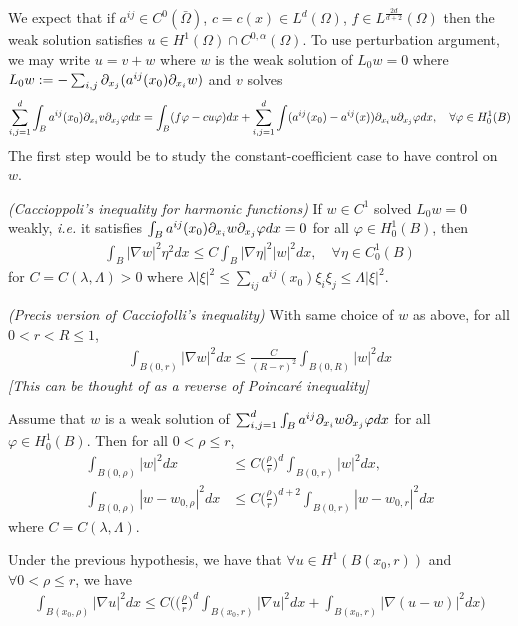 \documentclass[10pt,a4paper]{article}
\begin{document}
We expect that if $a^{ij} \in C^0(\bar{\Omega})$, $c =c(x) \in L^d(\Omega)$, $f\in L^{\frac{2d}{d+2}}(\Omega)$ then the weak solution satisfies $u\in H^1(\Omega) \cap C^{0, \alpha}(\Omega)$. To use perturbation argument, we may write $u= v+w$ where $w$ is the weak solution of $L_0 w =0$ where $L_0 w := - \sum_{i,j} \partial_{x_j}(a^{ij}(x_0) \partial_{x_i} w)$ and $v$ solves
\begin{align*}
\sum_{i,j=1}^d \int_B a^{ij}(x_0) \partial_{x_i} v \partial_{x_j} \varphi dx = \int_B (f\varphi - cu\varphi) dx +\sum_{i,j=1}^d \int (a^{ij}(x_0) - a^{ij}(x)) \partial_{x_i} u \partial_{x_j} \varphi dx, \quad \forall \varphi \in H_0^1(B)
\end{align*}
The first step would be to study the constant-coefficient case to have control on $w$.
\s

\thm \emph{(Caccioppoli's inequality for harmonic functions)} If $w\in C^1$ solved $L_0 w= 0$ weakly, \textit{i.e.} it satisfies $\int_B a^{ij}(x_0) \partial_{x_i} w \partial_{x_j} \varphi dx =0$ for all $\varphi \in H_0^1(B)$, then 
\begin{align*}
\int_B |\nabla w|^2 \eta^2 dx \leq C \int_B |\nabla \eta|^2 |w|^2 dx, \quad \forall \eta \in C^1_0(B)
\end{align*}
for $C= C(\lambda, \Lambda) >0$ where $\lambda |\xi|^2 \leq \sum_{ij} a^{ij}(x_0) \xi_i \xi_j \leq \Lambda |\xi|^2$. 
\s

\corr \emph{(Precis version of Cacciofolli's inequality)} With same choice of $w$ as above, for all $0<r<R\leq 1$,
\begin{align*}
\int_{B(0,r)} |\nabla w|^2 dx \leq \frac{C}{(R-r)^2} \int_{B(0,R)} |w|^2 dx
\end{align*}
\emph{[This can be thought of as a reverse of Poincar\'e inequality]}
\s

\prop Assume that $w$ is a weak solution of $\sum_{i,j=1}^d \int_B a^{ij} \partial_{x_i} w \partial_{x_j} \varphi dx$ for all $\varphi \in H_0^1(B)$. Then for all  $0< \rho \leq r$, 
\begin{align*}
\int_{B(0, \rho)} |w|^2 dx &\leq C\big( \frac{\rho}{r} \big)^d \int_{B(0, r)} |w|^2 dx,\\
\int_{B(0, \rho)} |w - w_{0, \rho}|^2 dx &\leq C \big(\frac{\rho}{r} \big)^{d+2} \int_{B(0,r)} |w- w_{0,r}|^2 dx
\end{align*}
where $C= C(\lambda, \Lambda)$.
\s

\corr Under the previous hypothesis, we have that $\forall u\in H^1(B(x_0, r))$ and $\forall  0< \rho \leq r$, we have
\begin{align*}
\int_{B(x_0, \rho)} |\nabla u|^2 dx \leq C \Big( \big( \frac{\rho}{r}\big)^d \int_{B(x_0, r)} |\nabla u|^2 dx + \int_{B(x_0, r)} |\nabla(u-w)|^2 dx \Big)
\end{align*}
\s
\end{document}
